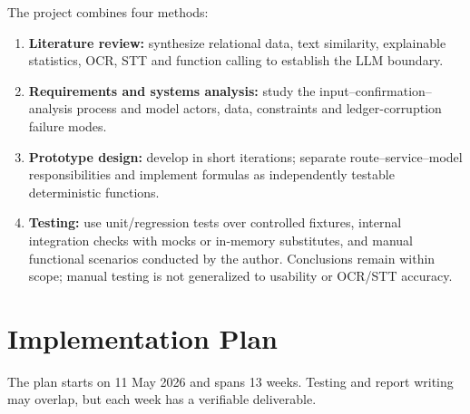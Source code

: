 The project combines four methods:

\begin{enumerate}
  \item \textbf{Literature review:} synthesize relational data, text similarity, explainable statistics, OCR, STT and function calling to establish the LLM boundary.
  \item \textbf{Requirements and systems analysis:} study the input--confirmation--analysis process and model actors, data, constraints and ledger-corruption failure modes.
  \item \textbf{Prototype design:} develop in short iterations; separate route--service--model responsibilities and implement formulas as independently testable deterministic functions.
  \item \textbf{Testing:} use unit/regression tests over controlled fixtures, internal integration checks with mocks or in-memory substitutes, and manual functional scenarios conducted by the author. Conclusions remain within scope; manual testing is not generalized to usability or OCR/STT accuracy.
\end{enumerate}

\section{Implementation Plan}

The plan starts on 11 May 2026 and spans 13 weeks. Testing and report writing may overlap, but each week has a verifiable deliverable.

